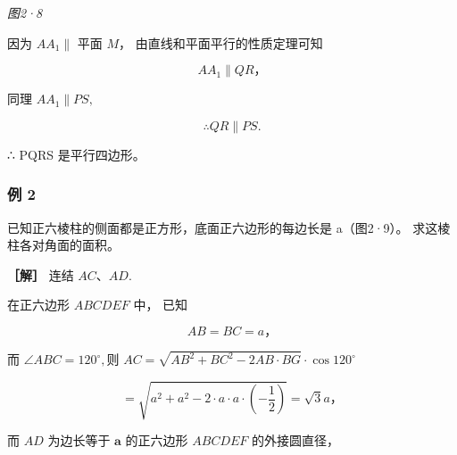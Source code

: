 \emph{图2·8}

因为 \(AA_{1} \parallel\) 平面 \(M\)， 由直线和平面平行的性质定理可知

\[
A A _ {1} \parallel Q R\text{，}
\]

同理 \(AA_{1}\parallel PS,\)

\[
\therefore Q R \parallel P S.
\]

∴ PQRS 是平行四边形。

\subsubsection{例 2}

已知正六棱柱的侧面都是正方形，底面正六边形的每边长是 a（图2·9）。
求这棱柱各对角面的面积。

\textbf{［解］} 连结 \(AC\)、\(AD\).

在正六边形 \(ABCDEF\) 中， 已知

\[
A B = B C = a\text{，}
\]

而 \(\angle ABC = 120^{\circ},\)则
\(AC = \sqrt{AB^2 + BC^2 - 2AB\cdot BG}\cdot \cos 120^{\circ}\)

\[
= \sqrt {a ^ {2} + a ^ {2} - 2 \cdot a \cdot a \cdot \left(- \frac {1}{2}\right)} = \sqrt {3} a\text{，}
\]

而 \(AD\) 为边长等于 \(\pmb{a}\) 的正六边形 \(ABCDEF\) 的外接圆直径，

